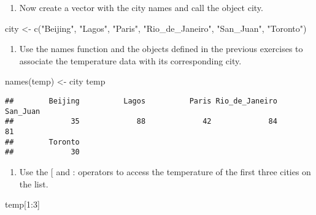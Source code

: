 \documentclass[
]{article}
\newenvironment{Shaded}{\begin{snugshade}}{\end{snugshade}}
\newcommand{\DecValTok}[1]{\textcolor[rgb]{0.00,0.00,0.81}{#1}}
\newcommand{\FunctionTok}[1]{\textcolor[rgb]{0.00,0.00,0.00}{#1}}
\newcommand{\NormalTok}[1]{#1}
\newcommand{\OtherTok}[1]{\textcolor[rgb]{0.56,0.35,0.01}{#1}}
\newcommand{\SpecialCharTok}[1]{\textcolor[rgb]{0.00,0.00,0.00}{#1}}
\newcommand{\StringTok}[1]{\textcolor[rgb]{0.31,0.60,0.02}{#1}}
\providecommand{\tightlist}{%
  \setlength{\itemsep}{0pt}\setlength{\parskip}{0pt}}
\begin{document}
\begin{enumerate}
\def\labelenumi{\arabic{enumi}.}
\setcounter{enumi}{1}
\tightlist
\item
  Now create a vector with the city names and call the object city.
\end{enumerate}

\begin{Shaded}
\begin{Highlighting}[]
\NormalTok{city }\OtherTok{\textless{}{-}} \FunctionTok{c}\NormalTok{(}\StringTok{"Beijing"}\NormalTok{, }\StringTok{"Lagos"}\NormalTok{, }\StringTok{"Paris"}\NormalTok{, }\StringTok{"Rio\_de\_Janeiro"}\NormalTok{, }\StringTok{"San\_Juan"}\NormalTok{, }\StringTok{"Toronto"}\NormalTok{)}
\end{Highlighting}
\end{Shaded}

\begin{enumerate}
\def\labelenumi{\arabic{enumi}.}
\setcounter{enumi}{2}
\tightlist
\item
  Use the names function and the objects defined in the previous
  exercises to associate the temperature data with its corresponding
  city.
\end{enumerate}

\begin{Shaded}
\begin{Highlighting}[]
\FunctionTok{names}\NormalTok{(temp) }\OtherTok{\textless{}{-}}\NormalTok{ city}
\NormalTok{temp}
\end{Highlighting}
\end{Shaded}

\begin{verbatim}
##        Beijing          Lagos          Paris Rio_de_Janeiro       San_Juan 
##             35             88             42             84             81 
##        Toronto 
##             30
\end{verbatim}

\begin{enumerate}
\def\labelenumi{\arabic{enumi}.}
\setcounter{enumi}{3}
\tightlist
\item
  Use the {[} and : operators to access the temperature of the first
  three cities on the list.
\end{enumerate}

\begin{Shaded}
\begin{Highlighting}[]
\NormalTok{temp[}\DecValTok{1}\SpecialCharTok{:}\DecValTok{3}\NormalTok{]}
\end{Highlighting}
\end{Shaded}
\end{document}
